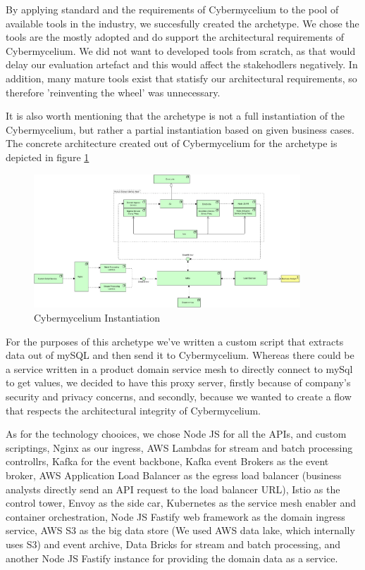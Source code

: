 \documentclass[review]{elsarticle}
\begin{document}
By applying standard and the requirements of Cybermycelium to the pool of available tools in the industry, we succesfully created the archetype. We chose the tools are the mostly adopted and do support the architectural requirements of Cybermycelium. We did not want to developed tools from scratch, as that would delay our evaluation artefact and this would affect the stakehodlers negatively. In addition, many mature tools exist that statisfy our architectural requirements, so therefore 'reinventing the wheel' was unnecessary.

It is also worth mentioning that the archetype is not a full instantiation of the Cybermycelium, but rather a partial instantiation based on given business cases. The concrete architecture created out of Cybermycelium for the archetype is depicted in figure \ref{fig:ConcreteCyberMycelium}

\begin{figure}[h!]
    \centering
    \includegraphics[width=10cm]{Media/concrete-mycelium.jpg}
    \caption{Cybermycelium Instantiation}
    \label{fig:ConcreteCyberMycelium}
\end{figure}

For the purposes of this archetype we've written a custom script that extracts data out of mySQL and then send it to Cybermycelium. Whereas there could be a service written in a product domain service mesh to directly connect to mySql to get values, we decided to have this proxy server, firstly because of company's security and privacy concerns, and secondly, because we wanted to create a flow that respects the architectural integrity of Cybermycelium. 

As for the technology chooices, we chose Node JS for all the APIs, and custom scriptings, Nginx as our ingress, AWS Lambdas for stream and batch processing controllrs, Kafka for the event backbone, Kafka event Brokers as the event broker, AWS Application Load Balancer as the egress load balancer (business analysts directly send an API request to the load balancer URL), Istio as the control tower, Envoy as the side car, Kubernetes as the service mesh enabler and container orchestration, Node JS Fastify web framework as the domain ingress service, AWS S3 as the big data store (We used AWS data lake, which internally uses S3) and event archive, Data Bricks for stream and batch processing, and another Node JS Fastify instance for providing the domain data as a service. 
\end{document}
